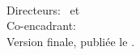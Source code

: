 \hfill
\vfill
{
	\small
	\noindent\textbf{\thesisName} \\
	\textit{\thesisTitle} \\
	\thesisSubject \\
	Directeurs: \thesisFirstSupervisor\ et \thesisSecondSupervisor \\
	Co-encadrant: \thesisFirstAdvisor \\
	Version finale, publiée le \thesisVersion. \\[1.5em]
	\textbf{\thesisUniversity} \\
	\thesisUniversityCollegium \\
	\thesisUniversityInstitute \\
	\thesisUniversityDepartment \\
	\thesisUniversityStreetAddress\ \thesisUniversityPostalCode\ \thesisUniversityCity
}
